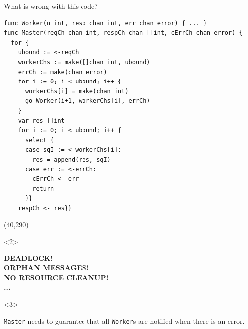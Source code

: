 \begin{frame}[fragile]{What is wrong with this code?}
  \scriptsize
  \begin{lstlisting}[language=Golang,
  belowskip=-0.6\baselineskip, aboveskip=-0.1\baselineskip]
func Worker(n int, resp chan int, err chan error) { ... }
func Master(reqCh chan int, respCh chan []int, cErrCh chan error) {
  for {
    ubound := <-reqCh
    workerChs := make([]chan int, ubound)
    errCh := make(chan error)
    for i := 0; i < ubound; i++ {
      workerChs[i] = make(chan int)
      go Worker(i+1, workerChs[i], errCh)
    }
    var res []int
    for i := 0; i < ubound; i++ {
      select {
      case sqI := <-workerChs[i]:
        res = append(res, sqI)
      case err := <-errCh:
        cErrCh <- err
        return
      }}
    respCh <- res}}
\end{lstlisting}
  \Put(40,290){%
    \begin{onlyenv}<2>
    \begin{minipage}{.86\columnwidth}
    \begin{infobox}
      \Large
      \textbf{DEADLOCK!}\vspace{.2cm}\\
      \textbf{ORPHAN MESSAGES!}\vspace{.2cm}\\
      \textbf{NO RESOURCE CLEANUP!}\vspace{.2cm}\\
      \textbf{...}
    \end{infobox}
    \end{minipage}
    \end{onlyenv}
    \begin{onlyenv}<3>
    \begin{minipage}{.86\columnwidth}
    \begin{greenbox}
      \Large
       \lstinline{Master} needs to guarantee that all \lstinline{Worker}s are
       notified when there is an error.
    \end{greenbox}
    \end{minipage}
    \end{onlyenv}
  }
\end{frame}

